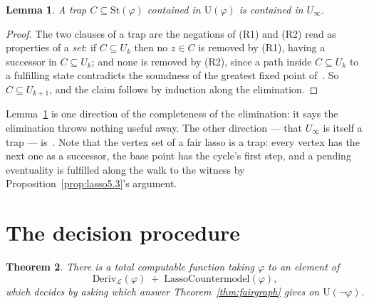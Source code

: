 \documentclass[11pt,a4paper]{article}
\newtheorem{theorem}{Theorem}[section]
\newtheorem{lemma}[theorem]{Lemma}
\theoremstyle{definition}
\newcommand{\St}{\mathrm{St}}
\newcommand{\Ust}{\mathrm{U}}
\begin{document}
\begin{lemma}\label{lem:trap}
A trap $C\subseteq\St(\varphi)$ contained in $\Ust(\varphi)$ is contained in
$U_\infty$.
\end{lemma}

\begin{proof}
The two clauses of a trap are the negations of (R1) and (R2) read as properties
of a \emph{set}: if $C\subseteq U_k$ then no $z\in C$ is removed by (R1),
having a successor in $C\subseteq U_k$; and none is removed by (R2), since a
path inside $C\subseteq U_k$ to a fulfilling state contradicts the soundness of
the greatest fixed point of~\cite[Rem.~3.2]{m4}.  So $C\subseteq U_{k+1}$, and
the claim follows by induction along the elimination.
\end{proof}

Lemma~\ref{lem:trap} is one direction of the completeness of the elimination:
it says the elimination throws nothing useful away.  The other direction ---
that $U_\infty$ is itself a trap --- is~\cite[Lem.~5.1]{m4}.  Note that the
vertex set of a fair lasso is a trap: every vertex has the next one as a
successor, the base point has the cycle's first step, and a pending eventuality
is fulfilled along the walk to the witness by
Proposition~\ref{prop:lasso5.3}'s argument.

\section{The decision procedure}\label{sec:decide}

\begin{theorem}\label{thm:sccmain}
There is a total computable function taking $\varphi$ to an element of
\[
  \mathrm{Deriv}_{\mathcal{L}}(\varphi)\;+\;\mathrm{LassoCountermodel}(\varphi),
\]
which decides by asking which answer Theorem~\ref{thm:fairgraph} gives on
$\Ust(\neg\varphi)$.
\end{theorem}
\end{document}
